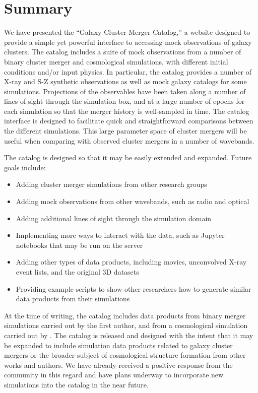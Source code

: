 \documentclass{emulateapj}
\begin{document}
\section{Summary}\label{sec:summary}

We have presented the ``Galaxy Cluster Merger Catalog,'' a website designed to provide a simple yet powerful interface to accessing mock observations of galaxy clusters. The catalog includes a suite of mock observations from a number of binary cluster merger and cosmological simulations, with different initial conditions and/or input physics. In particular, the catalog provides a number of X-ray and S-Z synthetic observations as well as mock galaxy catalogs for some simulations. Projections of the observables have been taken along a number of lines of sight through the simulation box, and at a large number of epochs for each simulation so that the merger history is well-sampled in time. The catalog interface is designed to facilitate quick and straightforward comparisons between the different simulations. This large parameter space of cluster mergers will be useful when comparing with observed cluster mergers in a number of wavebands.

The catalog is designed so that it may be easily extended and expanded. Future goals include:

\begin{itemize}
\item Adding cluster merger simulations from other research groups
\item Adding mock observations from other wavebands, such as radio and optical
\item Adding additional lines of sight through the simulation domain
\item Implementing more ways to interact with the data, such as Jupyter notebooks that may be run on the server
\item Adding other types of data products, including movies, unconvolved X-ray event lists, and the original 3D datasets
\item Providing example scripts to show other researchers how to generate similar data products from their simulations
\end{itemize}

At the time of writing, the catalog includes data products from binary merger simulations carried out by the first author, and from a cosmological simulation carried out by \citet{nel14}. The catalog is released and designed with the intent that it may be expanded to include simulation data products related to galaxy cluster mergers or the broader subject of cosmological structure formation from other works and authors. We have already received a positive response from the community in this regard and have plans underway to incorporate new simulations into the catalog in the near future.
\end{document}

